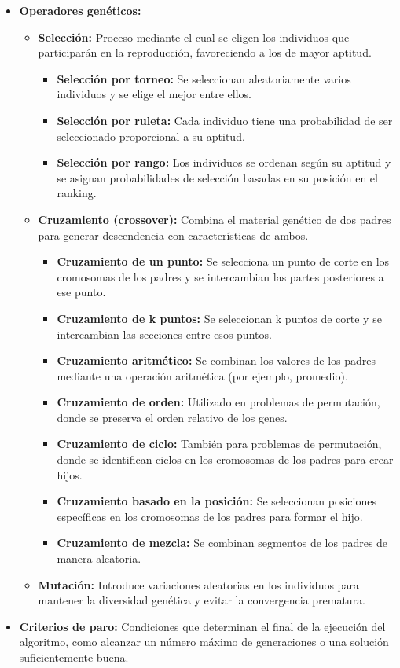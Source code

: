 \begin{itemize}
    \item \textbf{Operadores genéticos:}
    \begin{itemize}
        \item \textbf{Selección:} Proceso mediante el cual se eligen los individuos que participarán en la reproducción, 
            favoreciendo a los de mayor aptitud.
            \begin{itemize}
                \item \textbf{Selección por torneo:} Se seleccionan aleatoriamente varios individuos y se elige el mejor entre ellos.
                \item \textbf{Selección por ruleta:} Cada individuo tiene una probabilidad de ser seleccionado proporcional a su aptitud.
                \item \textbf{Selección por rango:} Los individuos se ordenan según su aptitud y se asignan probabilidades de selección basadas en su posición en el ranking.
            \end{itemize}
        \item \textbf{Cruzamiento (crossover):} Combina el material genético de dos padres para generar descendencia con
            características de ambos.
            \begin{itemize}
                \item \textbf{Cruzamiento de un punto:} Se selecciona un punto de corte en los cromosomas de los padres y se intercambian las partes posteriores a ese punto.
                \item \textbf{Cruzamiento de k puntos:} Se seleccionan k puntos de corte y se intercambian las secciones entre esos puntos.
                \item \textbf{Cruzamiento aritmético:} Se combinan los valores de los padres mediante una operación aritmética (por ejemplo, promedio).
                \item \textbf{Cruzamiento de orden:} Utilizado en problemas de permutación, donde se preserva el orden relativo de los genes.
                \item \textbf{Cruzamiento de ciclo:} También para problemas de permutación, donde se identifican ciclos en los cromosomas de los padres para crear hijos.
                \item \textbf{Cruzamiento basado en la posición:} Se seleccionan posiciones específicas en los cromosomas de los padres para formar el hijo.
                \item \textbf{Cruzamiento de mezcla:} Se combinan segmentos de los padres de manera aleatoria.
            \end{itemize}
        \item \textbf{Mutación:} Introduce variaciones aleatorias en los individuos para mantener la diversidad genética y
            evitar la convergencia prematura.
    \end{itemize}
    
    \item \textbf{Criterios de paro:} Condiciones que determinan el final de la ejecución del algoritmo, como alcanzar un 
        número máximo de generaciones o una solución suficientemente buena.
\end{itemize}

